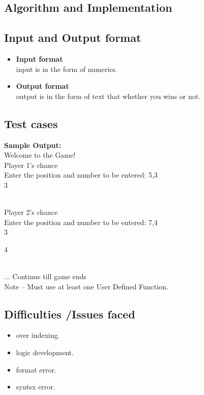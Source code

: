 \documentclass[12]{article}
\begin{document}
\subsection{Algorithm and Implementation}

\subsection{Input and Output format}
\begin{itemize}
\item \textbf{Input format}\\ 
input is in the form of numerics.
\item \textbf{Output format} \\
output is in the form of text that whether you wins or not.
\end{itemize}
\subsection{Test cases}
\textbf{Sample Output:} \\
Welcome to the Game! \\
Player 1’s chance \\
Enter the position and number to be entered: 5,3 \\








 3


 




\\
Player 2’s chance \\
Enter the position and number to be entered: 7,4 \\









 3


 4




\\
... Continue till game ends \\
Note – Must use at least one User Defined Function. \\

\subsection{Difficulties /Issues faced}
\begin{itemize}
\item over indexing.
\item logic development.
\item format error.
\item syntsx error.
\end{itemize}
\end{document}
